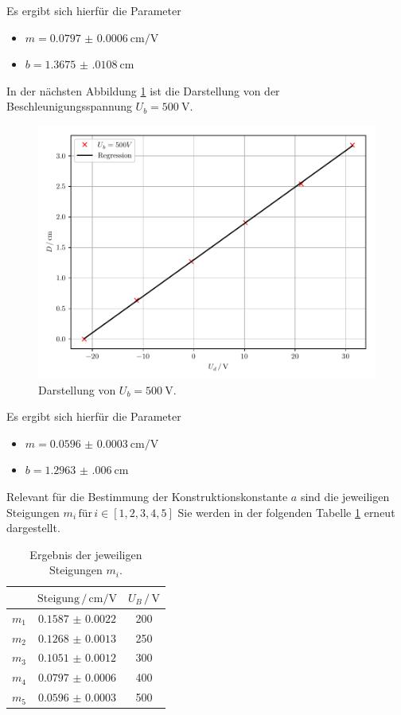 Es ergibt sich hierfür die Parameter
\begin{itemize}
  \item $m=\SI{0.0797(6)}{\centi\meter\per\volt}$
  \item $b=\SI{1.3675(0108)}{\centi\meter}$
\end{itemize}
In der nächsten Abbildung \ref{abb:10} ist die Darstellung von der Beschleunigungsspannung $U_b=\SI{500}{\volt}$.
\begin{figure}[H]
  \centering
  \includegraphics{plot5.pdf}
  \caption{Darstellung von $U_b=\SI{500}{\volt}$.}
  \label{abb:10}
\end{figure}
Es ergibt sich hierfür die Parameter
\begin{itemize}
  \item $m=\SI{0.0596(3)}{\centi\meter\per\volt}$
  \item $b=\SI{1.2963(0060)}{\centi\meter}$
\end{itemize}
Relevant für die Bestimmung der Konstruktionskonstante $a$ sind die jeweiligen Steigungen $m_i \,\text{für} \, i \in [1,2,3,4,5]$
Sie werden in der folgenden Tabelle \ref{tab:2} erneut dargestellt.
\begin{table}[H]
  \centering
  \caption{Ergebnis der jeweiligen Steigungen $m_i$.}
  \label{tab:2}
  \begin{tabular}{c c c}
\toprule
&$\text{Steigung} \,/\, \si{\centi\meter\per\volt}$& $U_B \, /\, \si{\volt}$\\
\midrule
$m_1$ & $\num{0.1587(22)}$& 200\\
$m_2$ & $\num{0.1268(13)}$& 250\\
$m_3$ & $\num{0.1051(12)}$& 300\\
$m_4$ & $\num{0.0797(6)}$ & 400\\
$m_5$ & $\num{0.0596(3)}$ & 500\\
\bottomrule
  \end{tabular}
\end{table}

